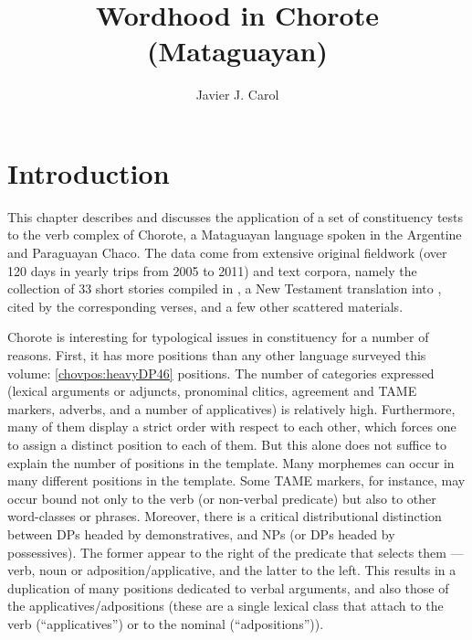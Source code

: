 \documentclass[output=paper]{langscibook}
\author{Javier J. Carol\orcid{}\affiliation{University of Buenos Aires}}
\title{Wordhood in Chorote (Mataguayan)}
\begin{document}
\maketitle 

\section{Introduction}
\largerpage
This chapter describes and discusses the application of a set of constituency tests to the verb complex of Chorote, a Mataguayan language spoken in the Argentine and Paraguayan Chaco. The data come from extensive original fieldwork (over 120 days in yearly trips from 2005 to 2011) and text corpora, namely the collection of 33 short stories compiled in \citet{DraysonGomez2000}, a New Testament translation into \citet{NewTestamentTranslationintoChorote1997}, cited by the corresponding verses, and a few other scattered materials.

Chorote is interesting for typological issues in constituency for a number of reasons. First, it has more positions than any other language surveyed this volume: \ref{chovpos:heavyDP46} positions. The number of categories expressed (lexical arguments or adjuncts, pronominal clitics, agreement and TAME markers, adverbs, and a number of applicatives) is relatively high. Furthermore, many of them display a strict order with respect to each other, which forces one to assign a distinct position to each of them. But this alone does not suffice to explain the number of positions in the template. Many morphemes can occur in many different positions in the template. Some TAME markers, for instance, may occur bound not only to the verb (or non-verbal predicate) but also to other word-classes or phrases. Moreover, there is a critical distributional distinction between DPs headed by demonstratives, and NPs (or DPs headed by possessives). The former appear to the right of the predicate that selects them — verb, noun or adposition/applicative, and the latter to the left. This results in a  duplication of many positions dedicated to verbal arguments, and also those of the applicatives/adpositions (these are a single lexical class that attach to the verb (``applicatives'') or to the nominal (``adpositions'')).
\end{document}
